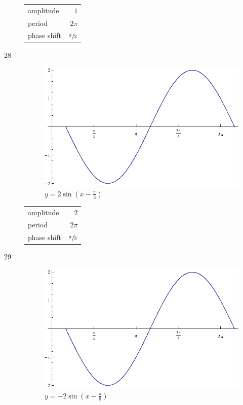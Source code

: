 \documentclass{exam}
\begin{document}
\begin{description}
        \begin{tabular}[H]{lr}
          \toprule
          amplitude   & $1$ \\
          period      & $2 \pi$ \\
          phase shift & $\sfrac{\pi}{2}$ \\
          \bottomrule
        \end{tabular}

      \item[28]
        \begin{figure}[H]
          \centering
          \includegraphics[scale=0.8]{exercise28.eps}
          \caption{$y = 2 \sin \left( x - \frac{\pi}{3} \right)$}
        \end{figure}

        \begin{tabular}[H]{lr}
          \toprule
          amplitude   & $2$ \\
          period      & $2 \pi$ \\
          phase shift & $\sfrac{\pi}{3}$ \\
          \bottomrule
        \end{tabular}

      \item[29]
        \begin{figure}[H]
          \centering
          \includegraphics[scale=0.8]{exercise29.eps}
          \caption{$y = - 2 \sin \left( x - \frac{\pi}{6} \right)$}
        \end{figure}


\end{description}
\end{document}
